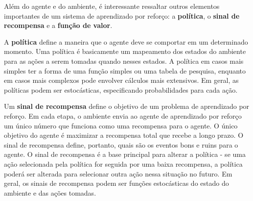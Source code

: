 
 Além do agente e do ambiente, é interessante ressaltar outros elementos importantes de um sistema de aprendizado por reforço: a \textbf{política}, o \textbf{sinal de recompensa} e a \textbf{função de valor}.

 A \textbf{política} define a maneira que o agente deve se comportar em um determinado momento. 
 Uma política é basicamente um mapeamento dos estados do ambiente para as ações a serem tomadas quando nesses estados. 
 A política em casos mais simples ter a forma de uma função simples ou uma tabela de pesquisa, enquanto em casos mais complexos pode envolver cálculos mais extensivos. 
 Em geral, as políticas podem ser estocásticas, especificando probabilidades para cada ação.

 Um \textbf{sinal de recompensa} define o objetivo de um problema de aprendizado por reforço. 
 Em cada etapa, o ambiente envia ao agente de aprendizado por reforço um único número que funciona como uma recompensa para o agente. 
 O único objetivo do agente é maximizar a recompensa total que recebe a longo prazo.
 O sinal de recompensa define, portanto, quais são os eventos bons e ruins para o agente. 
 O sinal de recompensa é a base principal para alterar a política - se uma ação selecionada pela política for seguida por uma baixa recompensa, a política poderá ser alterada para selecionar outra ação nessa situação no futuro. 
 Em geral, os sinais de recompensa podem ser funções estocásticas do estado do ambiente e das ações tomadas.

